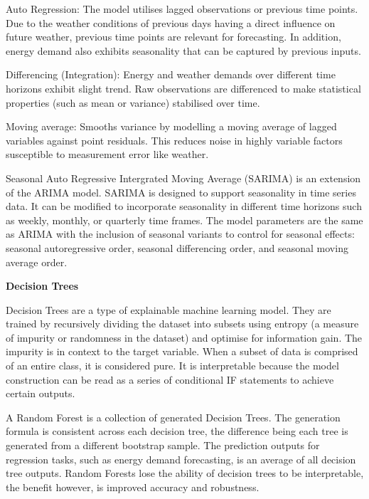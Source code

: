 \documentclass[mstat,12pt]{unswthesis}
\begin{document}
\bigskip

Auto Regression: The model utilises lagged observations or previous time points. Due to the weather conditions of previous days having a direct influence on future weather, previous time points are relevant for forecasting. In addition, energy demand also exhibits seasonality that can be captured by previous inputs.

\bigskip

Differencing (Integration): Energy and weather demands over different time horizons exhibit slight trend. Raw observations are differenced to make statistical properties (such as mean or variance) stabilised over time.

\bigskip

Moving average: Smooths variance by modelling a moving average of lagged variables against point residuals. This reduces noise in highly variable factors susceptible to measurement error like weather.

\bigskip

Seasonal Auto Regressive Intergrated Moving Average (SARIMA) is an extension of the ARIMA model. SARIMA is designed to support seasonality in time series data. It can be modified to incorporate seasonality in different time horizons such as weekly, monthly, or quarterly time frames. The model parameters are the same as ARIMA with the inclusion of seasonal variants to control for seasonal effects: seasonal autoregressive order, seasonal differencing order, and seasonal moving average order.

\bigskip

\noindent \textbf{Decision Trees}

\bigskip

\noindent Decision Trees are a type of explainable machine learning model. They are trained by recursively dividing the dataset into subsets using entropy (a measure of impurity or randomness in the dataset) and optimise for information gain. The impurity is in context to the target variable. When a subset of data is comprised of an entire class, it is considered pure. It is interpretable because the model construction can be read as a series of conditional IF statements to achieve certain outputs.

\bigskip

A Random Forest is a collection of generated Decision Trees. The generation formula is consistent across each decision tree, the difference being each tree is generated from a different bootstrap sample. The prediction outputs for regression tasks, such as energy demand forecasting, is an average of all decision tree outputs. Random Forests lose the ability of decision trees to be interpretable, the benefit however, is improved accuracy and robustness.
\end{document}
